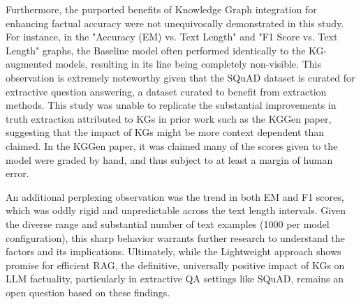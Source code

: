 \documentclass{article}
\begin{document}
Furthermore, the purported benefits of Knowledge Graph integration for enhancing factual accuracy were not unequivocally demonstrated in this study. For instance, in the "Accuracy (EM) vs. Text Length" and "F1 Score vs. Text Length" graphs, the Baseline model often performed identically to the KG-augmented models, resulting in its line being completely non-visible. This observation is extremely noteworthy given that the SQuAD dataset is curated for extractive question answering, a dataset curated to benefit from extraction methods. This study was unable to replicate the substantial improvements in truth extraction attributed to KGs in prior work such as the KGGen paper, suggesting that the impact of KGs might be more context dependent than claimed.
In the KGGen paper, it was claimed many of the scores given to the model were graded by hand, and thus subject to at least a margin of human error.

An additional perplexing observation was the trend in both EM and F1 scores, which was oddly rigid and unpredictable across the text length intervals. Given the diverse range and substantial number of text examples (1000 per model configuration), this sharp behavior warrants further research to understand the factors and its implications. Ultimately, while the Lightweight approach shows promise for efficient RAG, the definitive, universally positive impact of KGs on LLM factuality, particularly in extractive QA settings like SQuAD, remains an open question based on these findings.
\end{document}
